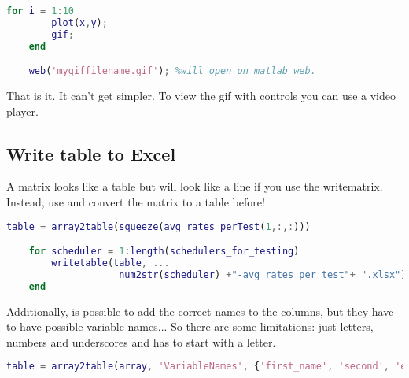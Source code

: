 \begin{lstlisting}[language=matlab]
    for i = 1:10
        plot(x,y);
        gif;
    end

    web('mygiffilename.gif'); %will open on matlab web.
\end{lstlisting}

\par That is it. It can't get simpler. To view the gif with controls you can use a video player.



\subsection{Write table to Excel}
\par A matrix looks like a table but will look like a line if you use the writematrix. Instead, use  and convert the matrix to a table before!

\begin{lstlisting}[language=matlab]
    table = array2table(squeeze(avg_rates_perTest(1,:,:)))

    for scheduler = 1:length(schedulers_for_testing)
        writetable(table, ...
                    num2str(scheduler) +"-avg_rates_per_test"+ ".xlsx");
    end
\end{lstlisting}

\par Additionally, is possible to add the correct names to the columns, but they have to have possible variable names... So there are some limitations: just letters, numbers and underscores and has to start with a letter.

\begin{lstlisting}[language=matlab]
    table = array2table(array, 'VariableNames', {'first_name', 'second', 'etc'});
\end{lstlisting}


